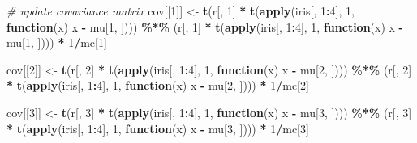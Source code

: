\documentclass[12pt]{article}
\newenvironment{Shaded}{\begin{snugshade}}{\end{snugshade}}
\newcommand{\CommentTok}[1]{\textcolor[rgb]{0.56,0.35,0.01}{\textit{#1}}}
\newcommand{\ControlFlowTok}[1]{\textcolor[rgb]{0.13,0.29,0.53}{\textbf{#1}}}
\newcommand{\DecValTok}[1]{\textcolor[rgb]{0.00,0.00,0.81}{#1}}
\newcommand{\FunctionTok}[1]{\textcolor[rgb]{0.13,0.29,0.53}{\textbf{#1}}}
\newcommand{\NormalTok}[1]{#1}
\newcommand{\OtherTok}[1]{\textcolor[rgb]{0.56,0.35,0.01}{#1}}
\newcommand{\SpecialCharTok}[1]{\textcolor[rgb]{0.81,0.36,0.00}{\textbf{#1}}}
\begin{document}
\begin{Shaded}
\begin{Highlighting}[]
\CommentTok{\# update covariance matrix}
\NormalTok{cov[[}\DecValTok{1}\NormalTok{]] }\OtherTok{\textless{}{-}} \FunctionTok{t}\NormalTok{(r[, }\DecValTok{1}\NormalTok{] }\SpecialCharTok{*} \FunctionTok{t}\NormalTok{(}\FunctionTok{apply}\NormalTok{(iris[, }\DecValTok{1}\SpecialCharTok{:}\DecValTok{4}\NormalTok{], }\DecValTok{1}\NormalTok{, }\ControlFlowTok{function}\NormalTok{(x) x }\SpecialCharTok{{-}}\NormalTok{ mu[}\DecValTok{1}\NormalTok{, ]))) }\SpecialCharTok{\%*\%} 
\NormalTok{    (r[, }\DecValTok{1}\NormalTok{] }\SpecialCharTok{*} \FunctionTok{t}\NormalTok{(}\FunctionTok{apply}\NormalTok{(iris[, }\DecValTok{1}\SpecialCharTok{:}\DecValTok{4}\NormalTok{], }\DecValTok{1}\NormalTok{, }\ControlFlowTok{function}\NormalTok{(x) x }\SpecialCharTok{{-}}\NormalTok{ mu[}\DecValTok{1}\NormalTok{, ]))) }\SpecialCharTok{*} \DecValTok{1}\SpecialCharTok{/}\NormalTok{mc[}\DecValTok{1}\NormalTok{]}

\NormalTok{cov[[}\DecValTok{2}\NormalTok{]] }\OtherTok{\textless{}{-}} \FunctionTok{t}\NormalTok{(r[, }\DecValTok{2}\NormalTok{] }\SpecialCharTok{*} \FunctionTok{t}\NormalTok{(}\FunctionTok{apply}\NormalTok{(iris[, }\DecValTok{1}\SpecialCharTok{:}\DecValTok{4}\NormalTok{], }\DecValTok{1}\NormalTok{, }\ControlFlowTok{function}\NormalTok{(x) x }\SpecialCharTok{{-}}\NormalTok{ mu[}\DecValTok{2}\NormalTok{, ]))) }\SpecialCharTok{\%*\%} 
\NormalTok{    (r[, }\DecValTok{2}\NormalTok{] }\SpecialCharTok{*} \FunctionTok{t}\NormalTok{(}\FunctionTok{apply}\NormalTok{(iris[, }\DecValTok{1}\SpecialCharTok{:}\DecValTok{4}\NormalTok{], }\DecValTok{1}\NormalTok{, }\ControlFlowTok{function}\NormalTok{(x) x }\SpecialCharTok{{-}}\NormalTok{ mu[}\DecValTok{2}\NormalTok{, ]))) }\SpecialCharTok{*} \DecValTok{1}\SpecialCharTok{/}\NormalTok{mc[}\DecValTok{2}\NormalTok{]}

\NormalTok{cov[[}\DecValTok{3}\NormalTok{]] }\OtherTok{\textless{}{-}} \FunctionTok{t}\NormalTok{(r[, }\DecValTok{3}\NormalTok{] }\SpecialCharTok{*} \FunctionTok{t}\NormalTok{(}\FunctionTok{apply}\NormalTok{(iris[, }\DecValTok{1}\SpecialCharTok{:}\DecValTok{4}\NormalTok{], }\DecValTok{1}\NormalTok{, }\ControlFlowTok{function}\NormalTok{(x) x }\SpecialCharTok{{-}}\NormalTok{ mu[}\DecValTok{3}\NormalTok{, ]))) }\SpecialCharTok{\%*\%} 
\NormalTok{    (r[, }\DecValTok{3}\NormalTok{] }\SpecialCharTok{*} \FunctionTok{t}\NormalTok{(}\FunctionTok{apply}\NormalTok{(iris[, }\DecValTok{1}\SpecialCharTok{:}\DecValTok{4}\NormalTok{], }\DecValTok{1}\NormalTok{, }\ControlFlowTok{function}\NormalTok{(x) x }\SpecialCharTok{{-}}\NormalTok{ mu[}\DecValTok{3}\NormalTok{, ]))) }\SpecialCharTok{*} \DecValTok{1}\SpecialCharTok{/}\NormalTok{mc[}\DecValTok{3}\NormalTok{]}


\end{Highlighting}
\end{Shaded}
\end{document}
